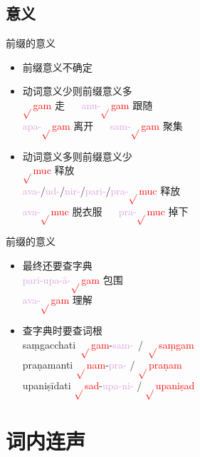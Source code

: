 \documentclass[17pt]{beamer}
\newcommand{\verbroot}[1]{\textcolor{red}{$\sqrt{}$#1}}
\newcommand{\fullpada}[1]{\textcolor{OliveGreen}{#1}}
\newcommand{\pratyaya}[1]{\textcolor{Plum}{#1}}
\begin{document}
\subsection{意义}
\begin{frame}{前缀的意义}
  \begin{itemize}
    \item 前缀意义不确定 \\
    \item 动词意义少则前缀意义多 \\
      \verbroot{gam} 走 ~~ \pratyaya{anu\nobreakdash-}\verbroot{gam} 跟随 \\
      \pratyaya{apa\nobreakdash-}\verbroot{gam} 离开 ~~ \pratyaya{sam\nobreakdash-}\verbroot{gam} 聚集  
    \item 动词意义多则前缀意义少 \\
      \verbroot{muc} 释放 ~~ \\
      \pratyaya{ava\nobreakdash-}/\pratyaya{ud\nobreakdash-}/\pratyaya{nir\nobreakdash-}/\pratyaya{pari\nobreakdash-}/\pratyaya{pra\nobreakdash-}\verbroot{muc} 释放 \\
      \pratyaya{ava\nobreakdash-}\verbroot{muc} 脱衣服 ~~ \pratyaya{pra\nobreakdash-}\verbroot{muc} 掉下
  \end{itemize}
\end{frame}

\begin{frame}{前缀的意义}
  \begin{itemize}
    \item 最终还要查字典 \\
    \pratyaya{pari\nobreakdash-upa\nobreakdash-ā\nobreakdash-}\verbroot{gam} 包围 \\
    \pratyaya{ava\nobreakdash-}\verbroot{gam} 理解 \\ 
    \item 查字典时要查词根 \\
      \mbox{\fullpada{saṃgacchati} \verbroot{gam}\nobreakdash-\pratyaya{sam\nobreakdash-} / \verbroot{saṃgam}}\\
      \fullpada{praṇamanti} \verbroot{nam}\nobreakdash-\pratyaya{pra\nobreakdash-} / \verbroot{praṇam}\\  
      \fullpada{upaniṣīdati} \verbroot{sad}\nobreakdash-\pratyaya{upa\nobreakdash-ni\nobreakdash-} / \verbroot{upaniṣad}\\ 
  \end{itemize}
\end{frame}


\section{词内连声}
\begin{frame}{\insertsection }
  \small
  \tableofcontents[currentsection]
\end{frame}
\end{document}
